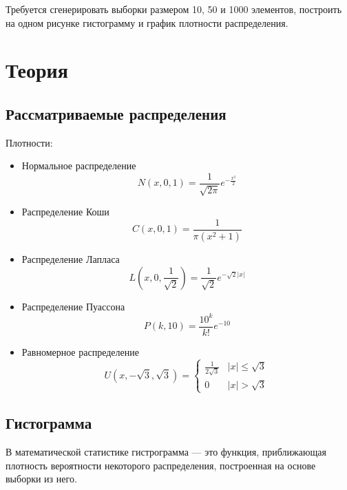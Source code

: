 \documentclass[12pt,a4paper]{article}
\begin{document}
Требуется сгенерировать выборки размером 10, 50 и 1000 элементов, построить на одном рисунке гистограмму и график плотности распределения.

\pagebreak

\section{Теория}
\subsection{Рассматриваемые распределения}
Плотности:

\begin{itemize}
	\item Нормальное распределение 
	\begin{equation}
	N(x, 0, 1)=\frac{1}{\sqrt{2\pi}}e^{-\frac{x^2}{2}}
	\end{equation}
	
	\item Распределение Коши
	\begin{equation}
	C(x, 0, 1)=\frac{1}{\pi(x^2+1)}
	\end{equation}
	
	\item Распределение Лапласа
	\begin{equation}
	L(x, 0, \frac{1}{\sqrt{2}})=\frac{1}{\sqrt{2}}e^{-\sqrt{2}|x|}
	\end{equation}
	
	\item Распределение Пуассона
	\begin{equation}
	P(k, 10)=\frac{10^k}{k!}e^{-10}
	\end{equation} 
	
	\item Равномерное распределение
	\begin{equation}
	U(x, -\sqrt{3}, \sqrt{3}) =
	\begin{cases}
	\frac{1}{2\sqrt{3}} & |x| \leq \sqrt{3} \\
	0 & |x|>\sqrt{3}
	\end{cases}
	\end{equation}	
\end{itemize}

\subsection{Гистограмма}
В математической статистике гистрограмма — это функция, приближающая плотность вероятности некоторого распределения, построенная на основе выборки из него. \cite{Histogram}
\end{document}
